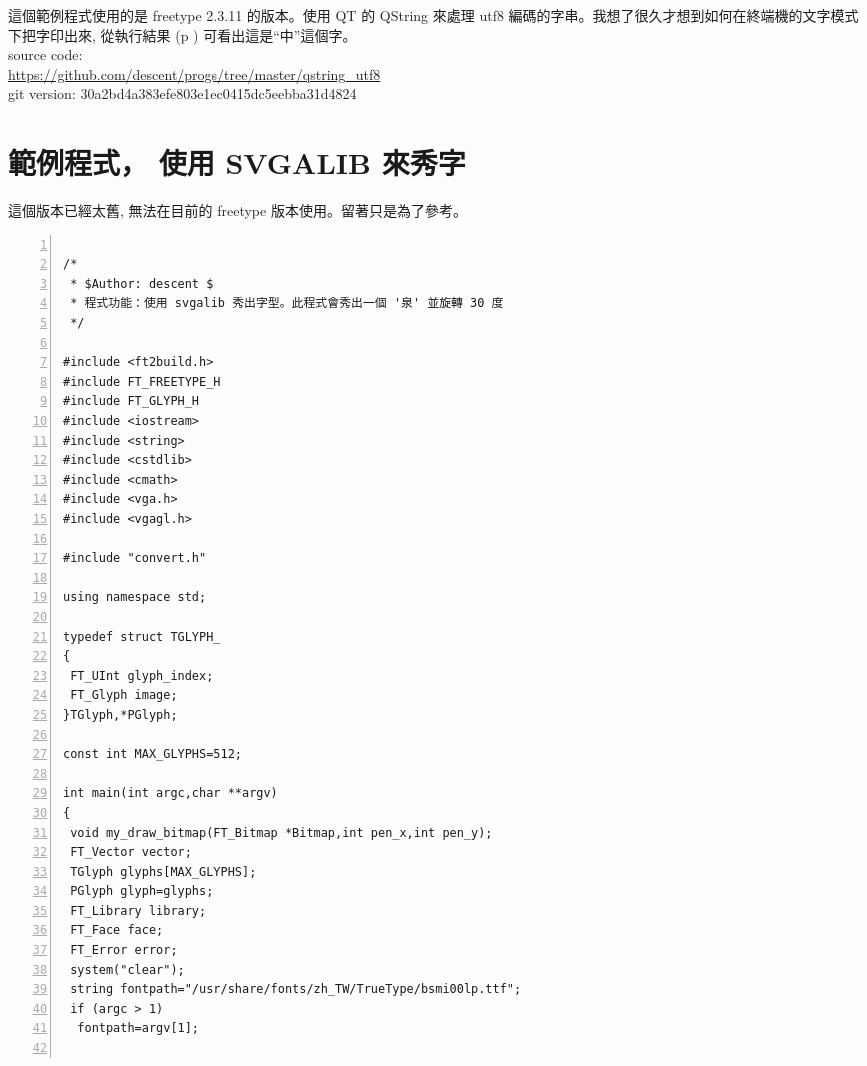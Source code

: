 \documentclass[12pt,a4]{article}
\begin{document}
\begin{CJK}{UTF8}{bsmi}
這個範例程式使用的是 freetype 2.3.11 的版本。使用 QT 的 QString 來處理 utf8
編碼的字串。我想了很久才想到如何在終端機的文字模式下把字印出來, 從執行結果 (p \pageref{lst::result})
可看出這是``中''這個字。\\
source code:\\
\href{https://github.com/descent/progs/tree/master/qstring_utf8}{https://github.com/descent/progs/tree/master/qstring\_{}utf8}\\
git version: 30a2bd4a383efe803e1ec0415dc5eebba31d4824






\newpage


\newpage
\section{範例程式， 使用 SVGALIB 來秀字}
這個版本已經太舊, 無法在目前的 freetype 版本使用。留著只是為了參考。

\begin{Verbatim}[commandchars=@\^?,numbers=left]

/*
 * $Author: descent $
 * 程式功能：使用 svgalib 秀出字型。此程式會秀出一個 '泉' 並旋轉 30 度
 */
	
#include <ft2build.h>
#include FT_FREETYPE_H
#include FT_GLYPH_H
#include <iostream>
#include <string>
#include <cstdlib>
#include <cmath>
#include <vga.h>
#include <vgagl.h>

#include "convert.h"

using namespace std;

typedef struct TGLYPH_
{
 FT_UInt glyph_index;
 FT_Glyph image;
}TGlyph,*PGlyph;

const int MAX_GLYPHS=512;

int main(int argc,char **argv)
{
 void my_draw_bitmap(FT_Bitmap *Bitmap,int pen_x,int pen_y);
 FT_Vector vector;
 TGlyph glyphs[MAX_GLYPHS];
 PGlyph glyph=glyphs;
 FT_Library library;
 FT_Face face;
 FT_Error error;
 system("clear");
 string fontpath="/usr/share/fonts/zh_TW/TrueType/bsmi00lp.ttf";
 if (argc > 1)
  fontpath=argv[1];


\end{Verbatim}
\end{CJK}
\end{document}
